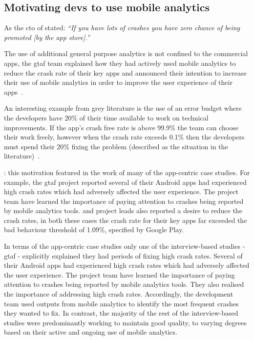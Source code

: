 \subsection{Motivating devs to use mobile analytics} As the \Gls{cto} of  stated: \emph{``If you have lots of crashes you have zero chance of being promoted [by the app store].''} %

The use of additional general purpose analytics is not confined to the commercial apps, the \Gls{gtaf} team explained how they had actively used mobile analytics to reduce the crash rate of their key apps and announced their intention to increase their use of mobile analytics in order to improve the user experience of their apps~. 

An interesting example from grey literature is the use of an error budget where the developers have 20\% of their time available to work on technical improvements. If the app's crash free rate is above 99.9\% the team can choose their work freely, however when the crash rate exceeds 0.1\% then the developers must spend their 20\% fixing the problem (described as the situation in the literature)~.


: this motivation featured in the work of many of the app-centric case studies. For example, the \Gls{gtaf} project reported several of their Android apps had experienced high crash rates which had adversely affected the user experience. The project team have learned the importance of paying attention to crashes being reported by mobile analytics tools.  and  project leads also reported a desire to reduce the crash rates, in both these cases the crash rate for their key apps far exceeded the bad behaviour threshold of 1.09\%, specified by Google Play. 

In terms of the app-centric case studies only one of the interview-based studies - \Gls{gtaf} - explicitly explained they had periods of fixing high crash rates. Several of their Android apps had experienced high crash rates which had adversely affected the user experience. The project team have learned the importance of paying attention to crashes being reported by mobile analytics tools. They also realised the importance of addressing high crash rates. Accordingly, the development team used outputs from mobile analytics to identify the most frequent crashes they wanted to fix. In contrast, the majority of the rest of the interview-based studies were predominantly working to maintain good quality, to varying degrees based on their active and ongoing use of mobile analytics.


